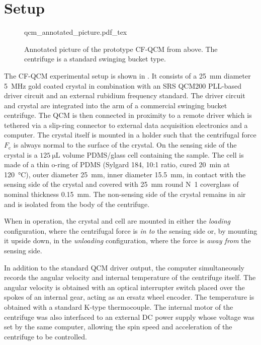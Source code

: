 \section{Setup}
\begin{figure}[ht]
\centering
{qcm_annotated_picture.pdf_tex}
\caption{Annotated picture of the prototype CF-QCM from above.  The
centrifuge is a standard swinging bucket type.}
\label{fig:cfqcmexpsetup}
\end{figure}

The CF-QCM experimental setup is shown in .  It
consists of a \SI{25}{\milli\meter} diameter \SI{5}{\mega\hertz} gold
coated crystal in combination with an SRS QCM200 PLL-based driver circuit
and an external rubidium frequency standard.  The driver circuit and
crystal are integrated into the arm of a commercial swinging bucket
centrifuge.  The QCM is then connected in proximity to a remote driver
which is tethered via a slip-ring connector to external data acquisition
electronics and a computer.  The crystal itself is mounted in a holder
such that the centrifugal force $F_\mathrm{c}$ is
always normal to the surface of the crystal.  On the sensing side of the
crystal is a $\SI{125}{\micro\liter}$ volume PDMS/glass cell containing the
sample.  The cell is made of a thin o-ring of PDMS (Sylgard 184, 10:1
ratio, cured \SI{20}{\minute} at \SI{120}{\celsius}),
outer diameter \SI{25}{\milli\meter}, inner diameter
\SI{15.5}{\milli\meter}, in
contact with the sensing side of the crystal and covered with
\SI{25}{\milli\meter} round N~1
coverglass of nominal thickness \SI{0.15}{\milli\meter}.  The non-sensing
side of the crystal remains in air and is isolated from the body of the
centrifuge.

When in operation, the crystal and cell are mounted in either the
\textit{loading} configuration, where the centrifugal force is \textit{in
to} the sensing side or, by mounting it upside down, in the
\textit{unloading} configuration, where the force is \textit{away from} the
sensing side.

In addition to the standard QCM driver output, the computer simultaneously
records the angular velocity and internal temperature of the centrifuge
itself.  The angular velocity is obtained with an optical interrupter
switch placed over the spokes of an internal gear, acting as an ersatz
wheel encoder.  The temperature is obtained with a standard K-type
thermocouple.  The internal motor of the centrifuge was also interfaced to
an external DC power supply whose voltage was set by the same
computer, allowing the spin speed and acceleration of the centrifuge to be
controlled.

